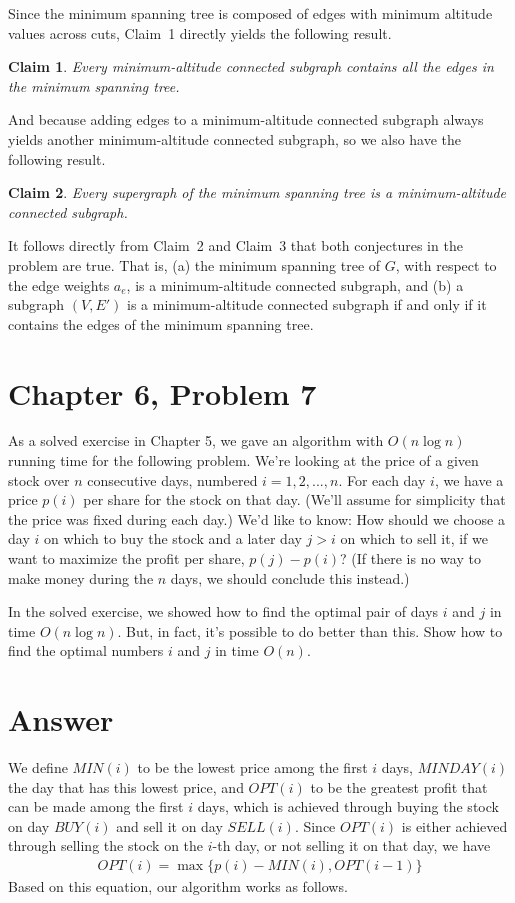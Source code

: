 \documentclass[12pt,letterpaper]{article}
\newtheorem{clm}{Claim}
\begin{document}
Since the minimum spanning tree is composed of edges with minimum altitude values across cuts, Claim~1 directly yields the following result.
\begin{clm}
Every minimum-altitude connected subgraph contains all the edges in the minimum spanning tree.
\end{clm}
And because adding edges to a minimum-altitude connected subgraph always yields another minimum-altitude connected subgraph, so we also have the following result.
\begin{clm}
Every supergraph of the minimum spanning tree is a minimum-altitude connected subgraph.
\end{clm}
It follows directly from Claim~2 and Claim~3 that both conjectures in the problem are true. That is, (a) the minimum spanning tree of $G$, with respect to the edge weights $a_e$, is a minimum-altitude connected subgraph, and (b) a subgraph $(V, E')$ is a minimum-altitude connected subgraph if and only if it contains the edges of the minimum spanning tree.

\section*{Chapter 6, Problem 7}
As a solved exercise in Chapter 5, we gave an algorithm with $O(n \log n)$
running time for the following problem. We're looking at the price of a
given stock over $n$ consecutive days, numbered $i = 1, 2, ..., n$. For each
day $i$, we have a price $p(i)$ per share for the stock on that day. (We'll
assume for simplicity that the price was fixed during each day.) We'd like
to know: How should we choose a day $i$ on which to buy the stock and a
later day $j > i$ on which to sell it, if we want to maximize the profit per
share, $p(j) - p(i)$? (If there is no way to make money during the $n$ days, we
should conclude this instead.)

In the solved exercise, we showed how to find the optimal pair of
days $i$ and $j$ in time $O(n \log n)$. But, in fact, it's possible to do better than
this. Show how to find the optimal numbers $i$ and $j$ in time $O(n)$.

\section*{Answer}
We define $MIN(i)$ to be the lowest price among the first $i$ days, $MINDAY(i)$ the day that has this lowest price, and $OPT(i)$ to be the greatest profit that can be made among the first $i$ days, which is achieved through buying the stock on day $BUY(i)$ and sell it on day $SELL(i)$. Since $OPT(i)$ is either achieved through selling the stock on the $i$-th day, or not selling it on that day, we have
\begin{align}
OPT(i) = \max\{p(i)-MIN(i), OPT(i-1)\}
\end{align}
Based on this equation, our algorithm works as follows.
\end{document}
